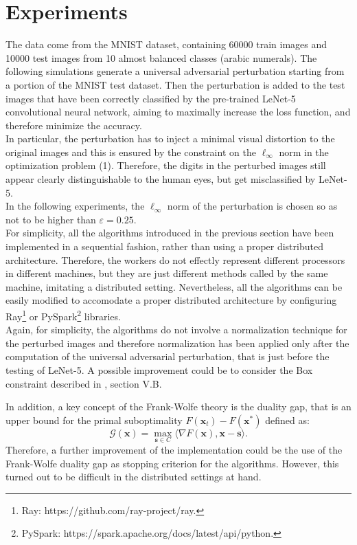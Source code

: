 \section{Experiments}
The data come from the MNIST dataset, containing 60000 train images and 10000 test images from 10 almost balanced classes (arabic numerals). The following simulations generate a universal adversarial perturbation starting from a portion of the MNIST test dataset. Then the perturbation is added to the test images that have been correctly classified by the pre-trained LeNet-5 convolutional neural network, aiming to maximally increase the loss function, and therefore minimize the accuracy.\\
\indent In particular, the perturbation has to inject a minimal visual distortion to the original images and this is ensured by the constraint on the $\ell_{\infty}$ norm in the optimization problem (1). Therefore, the digits in the perturbed images still appear clearly distinguishable to the human eyes, but get misclassified by LeNet-5.\\
\indent 
In the following experiments, the $\ell_{\infty}$ norm of the perturbation is chosen so as not to be higher than $\varepsilon=0.25$.\\

For simplicity, all the algorithms introduced in the previous section have been implemented in a sequential fashion, rather than using a proper distributed architecture. Therefore, the workers do not effectly represent different processors in different machines, but they are just different methods called by the same machine, imitating a distributed setting. Nevertheless, all the algorithms can be easily modified to accomodate a proper distributed architecture by configuring Ray\footnote{Ray: https://github.com/ray-project/ray.} or PySpark\footnote{PySpark: https://spark.apache.org/docs/latest/api/python.} libraries.\\

Again, for simplicity, the algorithms do not involve a normalization technique for the perturbed images and therefore normalization has been applied only after the computation of the universal adversarial perturbation, that is just before the testing of LeNet-5. A possible improvement could be to consider the Box constraint described in \cite{A1}, section V.B.\indent

In addition, a key concept of the Frank-Wolfe theory is the duality gap, that is an upper bound for the primal suboptimality $F(\mathbf{x}_t)-F(\mathbf{x}^*)$ defined as:
\begin{equation}
	\mathcal{G}(\mathbf{x}) =\max_{\mathbf{s}\in\mathit{C}} \langle \nabla F(\mathbf{x}),\mathbf{x}-\mathbf{s}\rangle.
\end{equation}
Therefore, a further improvement of the implementation could be the use of the Frank-Wolfe duality gap as stopping criterion for the algorithms. However, this turned out to be difficult in the distributed settings at hand.